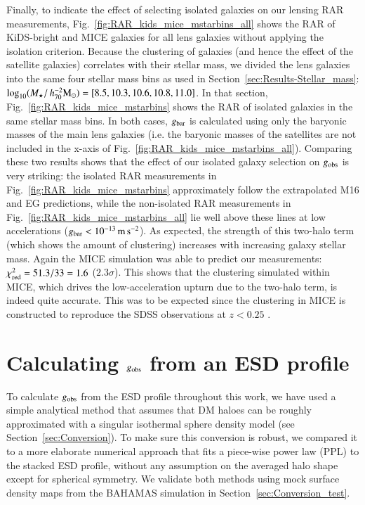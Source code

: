 \documentclass{aa}
\newcommand{\hmsun}{\,h_{70}^{-2} {\rm M_\odot}}
\newcommand{\mpss}{\,{\rm m}\,{\rm s}^{-2} }
\newcommand{\un}[1]{_{\rm #1}}
\begin{document}
Finally, to indicate the effect of selecting isolated galaxies on our lensing RAR measurements, Fig.~\ref{fig:RAR_kids_mice_mstarbins_all} shows the RAR of KiDS-bright and MICE galaxies for all lens galaxies without applying the isolation criterion. Because the clustering of galaxies (and hence the effect of the satellite galaxies) correlates with their stellar mass, we divided the lens galaxies into the same four stellar mass bins as used in Section~\ref{sec:Results-Stellar_mass}: $\log_{10}(M_\star/\hmsun) = [8.5,10.3,10.6,10.8,11.0]$. In that section, Fig.~\ref{fig:RAR_kids_mice_mstarbins} shows the RAR of isolated galaxies in the same stellar mass bins. In both cases, $g\un{bar}$ is calculated using only the baryonic masses of the main lens galaxies (i.e. the baryonic masses of the satellites are not included in the x-axis of Fig.~\ref{fig:RAR_kids_mice_mstarbins_all}). Comparing these two results shows that the effect of our isolated galaxy selection on $g\un{obs}$ is very striking: the isolated RAR measurements in Fig.~\ref{fig:RAR_kids_mice_mstarbins} approximately follow the extrapolated M16 and EG predictions, while the non-isolated RAR measurements in Fig.~\ref{fig:RAR_kids_mice_mstarbins_all} lie well above these lines at low accelerations ($g\un{bar}<10^{-13} \mpss$). As expected, the strength of this two-halo term (which shows the amount of clustering) increases with increasing galaxy stellar mass. Again the MICE simulation was able to predict our measurements: $\chi\un{red}^2 = 51.3 / 33 = 1.6$ ($2.3 \sigma$). This shows that the clustering simulated within MICE, which drives the low-acceleration upturn due to the two-halo term, is indeed quite accurate. This was to be expected since the clustering in MICE is constructed to reproduce the SDSS observations at $z<0.25$ \cite[]{zehavi2011}.


\section{Calculating $g\un{obs}$ from an ESD profile}
\label{app:PPL_method}

To calculate $g\un{obs}$ from the ESD profile throughout this work, we have used a simple analytical method that assumes that DM haloes can be roughly approximated with a singular isothermal sphere density model (see Section~\ref{sec:Conversion}). To make sure this conversion is robust, we compared it to a more elaborate numerical approach that fits a piece-wise power law (PPL) to the stacked ESD profile, without any assumption on the averaged halo shape except for spherical symmetry. We validate both methods using mock surface density maps from the BAHAMAS simulation in Section~\ref{sec:Conversion_test}.
\end{document}
